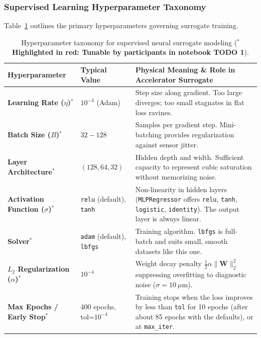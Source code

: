 \documentclass[11pt,a4paper]{article}
\begin{document}
\subsubsection{Supervised Learning Hyperparameter Taxonomy}
Table~\ref{tab:sl_hyperparams} outlines the primary hyperparameters governing surrogate training.

\begin{table}[h!]
\centering
\small
\begin{tabular}{@{}p{3.2cm} p{2.6cm} p{9.2cm}@{}}
\toprule
\textbf{Hyperparameter} & \textbf{Typical Value} & \textbf{Physical Meaning \& Role in Accelerator Surrogate} \\
\midrule
\textbf{\color{tunablered}Learning Rate ($\eta$)$^*$} & $10^{-3}$ (Adam) & Step size along gradient. Too large diverges; too small stagnates in flat loss ravines. \\
\textbf{\color{tunablered}Batch Size ($B$)$^*$} & $32 - 128$ & Samples per gradient step. Mini-batching provides regularization against sensor jitter. \\
\textbf{\color{tunablered}Layer Architecture$^*$} & $(128, 64, 32)$ & Hidden depth and width. Sufficient capacity to represent cubic saturation without memorizing noise. \\
\textbf{\color{tunablered}Activation Function ($\sigma$)$^*$} & \texttt{relu} (default), \texttt{tanh} & Non-linearity in hidden layers (\texttt{MLPRegressor} offers \texttt{relu}, \texttt{tanh}, \texttt{logistic}, \texttt{identity}). The output layer is always linear. \\
\textbf{\color{tunablered}Solver$^*$} & \texttt{adam} (default), \texttt{lbfgs} & Training algorithm. \texttt{lbfgs} is full-batch and suits small, smooth datasets like this one. \\
\textbf{\color{tunablered}$L_2$ Regularization ($\alpha$)$^*$} & $10^{-4}$ & Weight decay penalty $\frac{1}{2}\alpha\|\mathbf{W}\|_2^2$ suppressing overfitting to diagnostic noise ($\sigma = 10\ \mu\text{m}$). \\
\textbf{\color{tunablered}Max Epochs / Early Stop$^*$} & 400 epochs, tol=$10^{-4}$ & Training stops when the loss improves by less than \texttt{tol} for 10 epochs (after about 85 epochs with the defaults), or at \texttt{max\_iter}. \\
\bottomrule
\end{tabular}
\caption{Hyperparameter taxonomy for supervised neural surrogate modeling (\textbf{\color{tunablered}$^*$Highlighted in red: Tunable by participants in notebook TODO 1}).}
\label{tab:sl_hyperparams}
\end{table}
\end{document}
